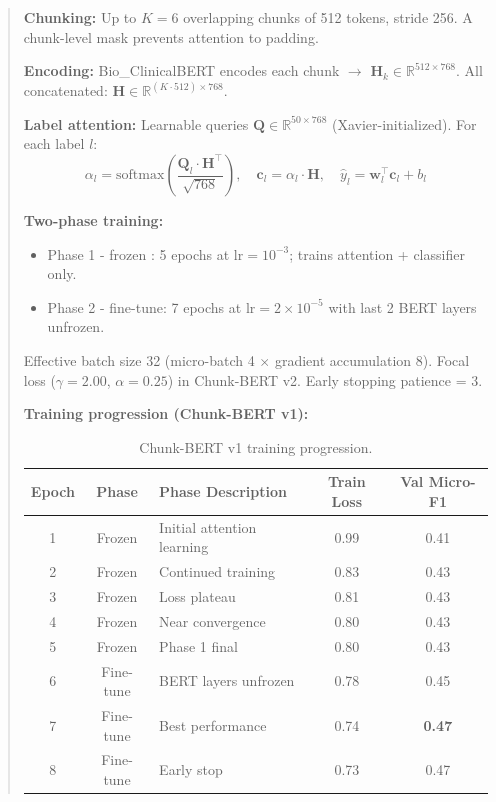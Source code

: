 \documentclass[11pt,a4paper]{article}
\begin{document}
\begin{abstract}
\textbf{Chunking:} Up to $K = 6$ overlapping chunks of 512 tokens, stride 256. A chunk-level mask prevents attention to padding.

\textbf{Encoding:} Bio\_ClinicalBERT encodes each chunk $\rightarrow$ $\mathbf{H}_k \in \mathbb{R}^{512 \times 768}$. All concatenated: $\mathbf{H} \in \mathbb{R}^{(K \cdot 512) \times 768}$.

\textbf{Label attention:} Learnable queries $\mathbf{Q} \in \mathbb{R}^{50 \times 768}$ (Xavier-initialized). For each label $l$:
\begin{equation}
    \alpha_l = \text{softmax}\!\left(\frac{\mathbf{Q}_l \cdot \mathbf{H}^\top}{\sqrt{768}}\right), \quad \mathbf{c}_l = \alpha_l \cdot \mathbf{H}, \quad \hat{y}_l = \mathbf{w}_l^\top \mathbf{c}_l + b_l
\end{equation}

\textbf{Two-phase training:}
\begin{itemize}[nosep,leftmargin=1.5em]
    \item {Phase 1 - frozen :} 5 epochs at $\text{lr} = 10^{-3}$; trains attention + classifier only.
    \item {Phase 2  - fine-tune:} 7 epochs at $\text{lr} = 2 \times 10^{-5}$ with last 2 BERT layers unfrozen.
\end{itemize}
Effective batch size 32 (micro-batch 4 $\times$ gradient accumulation 8). Focal loss ($\gamma = 2.00$, $\alpha = 0.25$) in Chunk-BERT v2. Early stopping patience = 3.

\textbf{Training progression (Chunk-BERT v1):}

\begin{table}[H]
\centering
\caption{Chunk-BERT v1 training progression.}
\label{tab:train_c}
\small
\begin{tabular}{cclcc}
\toprule
\textbf{Epoch} & \textbf{Phase} & \textbf{Phase Description} & \textbf{Train Loss} & \textbf{Val Micro-F1} \\
\midrule
1 & Frozen & Initial attention learning & 0.99 & 0.41 \\
2 & Frozen & Continued training        & 0.83 & 0.43 \\
3 & Frozen & Loss plateau              & 0.81 & 0.43 \\
4 & Frozen & Near convergence          & 0.80 & 0.43 \\
5 & Frozen & Phase 1 final             & 0.80 & 0.43 \\
6 & Fine-tune & BERT layers unfrozen   & 0.78 & 0.45 \\
7 & Fine-tune & Best performance       & 0.74 & \textbf{0.47} \\
8 & Fine-tune & Early stop             & 0.73 & 0.47 \\
\bottomrule
\end{tabular}
\end{table}


\end{abstract}
\end{document}
